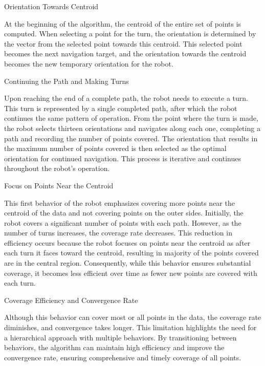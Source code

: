 Orientation Towards Centroid

At the beginning of the algorithm, the centroid of the entire set of points is computed. When selecting a point for the turn, the orientation is determined by the vector from the selected point towards this centroid. This selected point becomes the next navigation target, and the orientation towards the centroid becomes the new temporary orientation for the robot.

\vspace*{6mm}  

Continuing the Path and Making Turns

Upon reaching the end of a complete path, the robot needs to execute a turn. This turn is represented by a single completed path, after which the robot continues the same pattern of operation. From the point where the turn is made, the robot selects thirteen orientations and navigates along each one, completing a path and recording the number of points covered. The orientation that results in the maximum number of points covered is then selected as the optimal orientation for continued navigation. This process is iterative and continues throughout the robot's operation.

\vspace*{6mm}  

Focus on Points Near the Centroid

This first behavior of the robot emphasizes covering more points near the centroid of the data and not covering points on the outer sides. Initially, the robot covers a significant number of points with each path. However, as the number of turns increases, the coverage rate decreases. This reduction in efficiency occurs because the robot focuses on points near the centroid as after each turn it faces toward the centroid, resulting in majority of the points covered are in the central region. Consequently, while this behavior ensures substantial coverage, it becomes less efficient over time as fewer new points are covered with each turn.

\vspace*{6mm}  

Coverage Efficiency and Convergence Rate

Although this behavior can cover most or all points in the data, the coverage rate diminishes, and convergence takes longer. This limitation highlights the need for a hierarchical approach with multiple behaviors. By transitioning between behaviors, the algorithm can maintain high efficiency and improve the convergence rate, ensuring comprehensive and timely coverage of all points.

